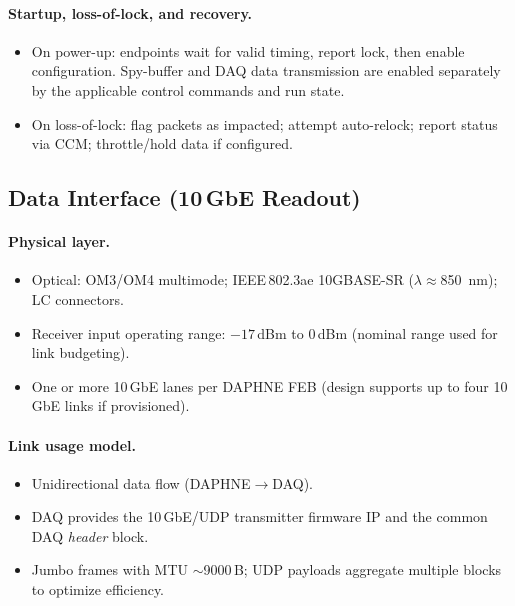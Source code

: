 \paragraph{Startup, loss-of-lock, and recovery.}
\begin{itemize}[nosep]
  \item On power-up: endpoints wait for valid timing, report lock, then enable configuration. Spy-buffer and DAQ data transmission are enabled separately by the applicable control commands and run state.
  \item On loss-of-lock: flag packets as impacted; attempt auto-relock; report status via CCM; throttle/hold data if configured.
\end{itemize}


\subsection{Data Interface (10\,GbE Readout)}
\label{sec:physical-data}

\paragraph{Physical layer.}
\begin{itemize}[nosep]
  \item Optical: OM3/OM4 multimode; IEEE\,802.3ae 10GBASE-SR (\(\lambda\approx\)\SI{850}{nm}); LC connectors.
  \item Receiver input operating range: \(-17\)\,dBm to \(0\)\,dBm (nominal range used for link budgeting).
  \item One or more 10\,GbE lanes per DAPHNE FEB (design supports up to four 10\,GbE links if provisioned).
\end{itemize}

\paragraph{Link usage model.}
\begin{itemize}[nosep]
  \item Unidirectional data flow (DAPHNE\(\to\)DAQ). 
  \item DAQ provides the 10\,GbE/UDP transmitter firmware IP and the common DAQ \emph{header} block.
  \item Jumbo frames with MTU \(\sim\)9000\,B; UDP payloads aggregate multiple blocks to optimize efficiency.
\end{itemize}




